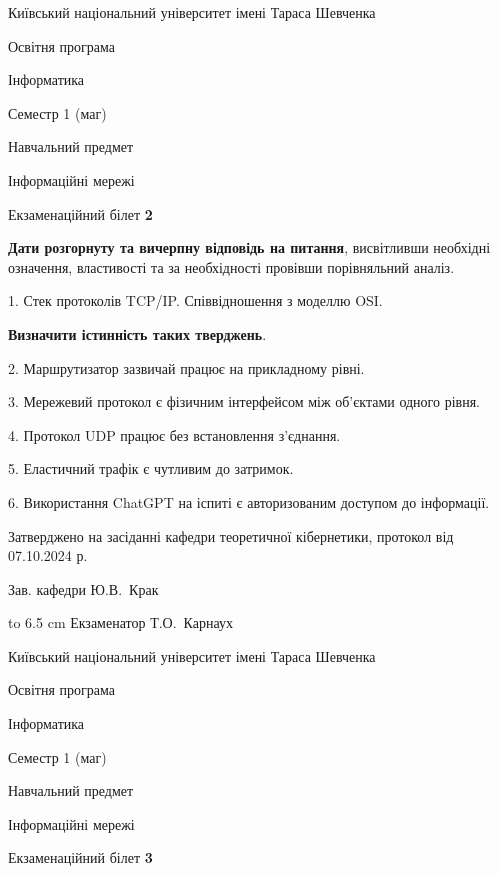 \documentclass[12pt, ukrainian]{article}
\begin{document}
\vspace{0.9cm}
{{\begin {scriptsize}\par
{ \center  Київський національний університет імені Тараса Шевченка \par}
{\parbox {5 cm}{Освітня програма \hfill}{\parbox {7 cm}{Інформатика\hfill}}\parbox {6 cm}{\hfill Семестр 1 (маг)}}\par
{\parbox {5 cm} {Навчальний предмет \hfill}\parbox {7 cm}{Інформаційні мережі \hfill}\parbox {6cm}{\hfill}\par}\vspace{-15pt} \end{scriptsize}}{\center Екзаменаційний білет \No \textbf { 2 }\par}}
{
\qquad\textbf{Дати розгорнуту та вичерпну відповідь на питання}, висвітливши необхідні означення, властивості та за необхідності провівши порівняльний аналіз.

1. Стек протоколів TCP/IP. Співвідношення з моделлю OSI.



\qquad\textbf{Визначити істинність таких тверджень}.

2. Маршрутизатор зазвичай працює на прикладному рівні.


3. Мережевий протокол є фізичним інтерфейсом між об'єктами одного рівня.


4. Протокол UDP працює без встановлення з'єднання.


5. Еластичний трафік є чутливим до затримок.


6. Використання ChatGPT на іспиті є авторизованим доступом до інформації.

}
{\smallskip\smallskip \begin {scriptsize} Затверджено на засіданні кафедри теоретичної кібернетики, протокол   від   07.10.2024 р.\par\smallskip\smallskip\smallskip\smallskip
{\parbox {6.5 cm} {Зав. кафедри \dotfill Ю.В.~Крак}}\hspace {0.7cm} {\hbox to 6.5 cm { Екзаменатор \dotfill Т.О.~Карнаух}} \end{scriptsize}}
\vspace{0.9cm}
{{\begin {scriptsize}\par
{ \center  Київський національний університет імені Тараса Шевченка \par}
{\parbox {5 cm}{Освітня програма \hfill}{\parbox {7 cm}{Інформатика\hfill}}\parbox {6 cm}{\hfill Семестр 1 (маг)}}\par
{\parbox {5 cm} {Навчальний предмет \hfill}\parbox {7 cm}{Інформаційні мережі \hfill}\parbox {6cm}{\hfill}\par}\vspace{-15pt} \end{scriptsize}}{\center Екзаменаційний білет \No \textbf { 3 }\par}}
\end{document}
